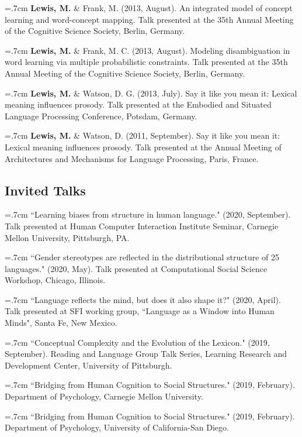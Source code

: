 \documentclass[letterpaper]{article}
\begin{document}
 \hangindent=.7cm {\bf Lewis, M.}  \& Frank, M. (2013, August). An integrated model of concept learning and word-concept mapping. Talk presented at the 35th Annual Meeting of the Cognitive Science Society, Berlin, Germany.

 \hangindent=.7cm {\bf Lewis, M.}  \& Frank, M. C.  (2013, August). Modeling disambiguation in word learning via multiple probabilistic constraints. Talk presented at the 35th Annual Meeting of the Cognitive Science Society, Berlin, Germany.

  \hangindent=.7cm {\bf Lewis, M.} \& Watson, D. G.  (2013, July). Say it like you mean it: Lexical meaning influences prosody. Talk presented at the Embodied and Situated Language Processing Conference, Potsdam, Germany.


 \hangindent=.7cm {\bf Lewis, M.}  \& Watson, D. (2011, September). Say it like you mean it: Lexical meaning influences prosody. Talk presented at the Annual Meeting of Architectures and Mechanisms for Language Processing, Paris, France.


\subsection*{Invited Talks}

\hangindent=.7cm ``Learning biases from structure in human language." (2020, September). Talk presented at Human Computer Interaction Institute Seminar, Carnegie Mellon University, Pittsburgh, PA.

\hangindent=.7cm ``Gender stereotypes are reflected in the distributional structure of 25 languages." (2020, May). Talk presented at Computational Social Science Workshop, Chicago, Illinois.

\hangindent=.7cm ``Language reflects the mind, but does it also shape it?" (2020, April). Talk presented at SFI working group, ``Language as a Window into Human Minds", Santa Fe, New Mexico.

\hangindent=.7cm ``Conceptual Complexity and the Evolution of the Lexicon." (2019, September). Reading and Language Group Talk Series, Learning Research and Development Center, University of Pittsburgh.

\hangindent=.7cm ``Bridging from Human Cognition to Social Structures." (2019, February). Department of Psychology, Carnegie Mellon University.

\hangindent=.7cm ``Bridging from Human Cognition to Social Structures." (2019, February). Department of Psychology, University of California-San Diego.
\end{document}
